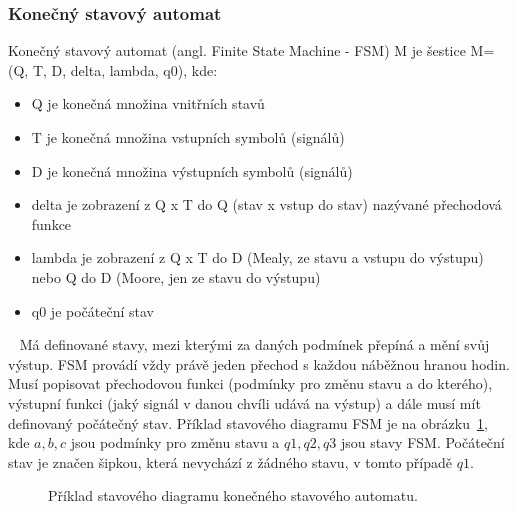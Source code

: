 \documentclass{report}
\begin{document}
\subsubsection{Konečný stavový automat}
Konečný stavový automat (angl. Finite State Machine - FSM) M je šestice M=(Q, T, D, delta, lambda, q0), kde:
\begin{itemize}
  \item Q je konečná množina vnitřních stavů
  \item T je konečná množina vstupních symbolů (signálů)
  \item D je konečná množina výstupních symbolů (signálů)
  \item delta je zobrazení z Q x T do Q (stav x vstup do stav) nazývané přechodová funkce
  \item lambda je zobrazení z Q x T do D (Mealy, ze stavu a vstupu do výstupu) nebo Q do D (Moore, jen ze stavu do výstupu)
  \item q0 je počáteční stav
\end{itemize}
~\cite{jazykyapreklady} Má definované stavy, mezi kterými za daných podmínek přepíná a mění svůj výstup. FSM provádí vždy právě jeden přechod s každou náběžnou hranou hodin. Musí popisovat přechodovou funkci (podmínky pro změnu stavu a do kterého), výstupní funkci (jaký signál v danou chvíli udává na výstup) a dále musí mít definovaný počátečný stav. Příklad stavového diagramu FSM je na obrázku~\ref{fig:fsmexample}, kde $a, b, c$ jsou podmínky pro změnu stavu a $q1, q2, q3$ jsou stavy FSM. Počáteční stav je značen šipkou, která nevychází z žádného stavu, v tomto případě $q1$.
\begin{figure}
\begin{center}
\end{center}
\caption{Příklad stavového diagramu konečného stavového automatu.}
\label{fig:fsmexample}
\end{figure}
\end{document}
